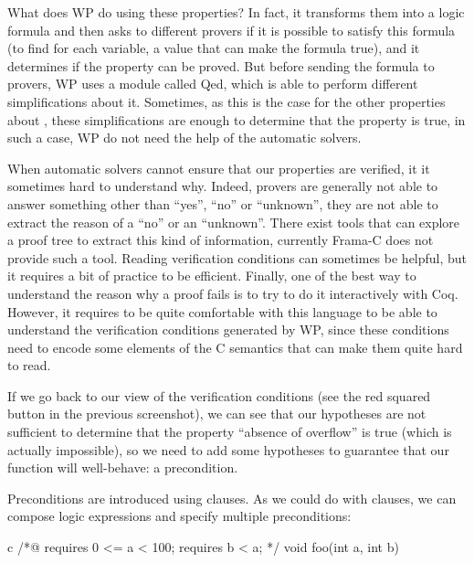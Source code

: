 What does WP do using these properties? In fact, it transforms them
into a logic formula and then asks to different provers if it is
possible to satisfy this formula (to find for each variable, a value
that can make the formula true), and it determines if the property can
be proved. But before sending the formula to provers, WP uses a module
called Qed, which is able to perform different simplifications about it.
Sometimes, as this is the case for the other properties about
, these simplifications are enough to determine that the
property is true, in such a case, WP do not need the help of the
automatic solvers.



When automatic solvers cannot ensure that our properties are verified,
it it sometimes hard to understand why. Indeed, provers are generally
not able to answer something other than ``yes'', ``no'' or ``unknown'',
they are not able to extract the reason of a ``no'' or an ``unknown''.
There exist tools that can explore a proof tree to extract this kind of
information, currently Frama-C does not provide such a tool. Reading
verification conditions can sometimes be helpful, but it requires a bit of
practice to be efficient. Finally, one of the best way to understand the reason
why a proof fails is to try to do it interactively with Coq. However, it
requires to be quite comfortable with this language to be able to understand
the verification conditions generated by WP, since these conditions
need to encode some elements of the C semantics that can make them quite
hard to read.



If we go back to our view of the verification conditions (see the red squared
button in the previous screenshot), we can see that our hypotheses are not
sufficient to determine that the property ``absence of overflow'' is true (which
is actually impossible), so we need to add some hypotheses to
guarantee that our function will well-behave: a precondition.






Preconditions are introduced using  clauses. As we
could do with  clauses, we can compose logic expressions
and specify multiple preconditions:



\begin{CodeBlock}{c}
/*@
  requires 0 <= a < 100;
  requires b < a;
*/
void foo(int a, int b){
  
}
\end{CodeBlock}



